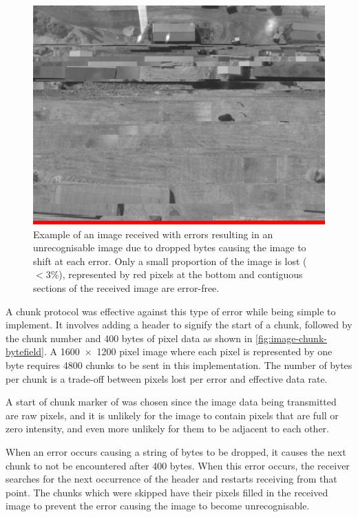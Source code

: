 \documentclass[]{report}
\begin{document}
\begin{figure}[H]
  \centering
  \includegraphics[width=\linewidth]{images/results/sheds_naive.png}
  \caption{Example of an image received with errors resulting in an unrecognisable image due to dropped bytes causing the image to shift at each error. Only a small proportion of the image is lost ($<3\%$), represented by red pixels at the bottom and contiguous sections of the received image are error-free.}
  \label{fig:image-sheds-error-demo}
\end{figure}

A chunk protocol was effective against this type of error while being simple to implement. It involves adding a header to signify the start of a chunk, followed by the chunk number and 400 bytes of pixel data as shown in \ref{fig:image-chunk-bytefield}. A \SI{1600x1200}{} pixel image where each pixel is represented by one byte requires 4800 chunks to be sent in this implementation. The number of bytes per chunk is a trade-off between pixels lost per error and effective data rate.

A start of chunk marker of \texttt{} was chosen since the image data being transmitted are raw pixels, and it is unlikely for the image to contain pixels that are full or zero intensity, and even more unlikely for them to be adjacent to each other.

When an error occurs causing a string of bytes to be dropped, it causes the next chunk to not be encountered after 400 bytes. When this error occurs, the receiver searches for the next occurrence of the header and restarts receiving from that point. The chunks which were skipped have their pixels filled in the received image to prevent the error causing the image to become unrecognisable.
\end{document}
